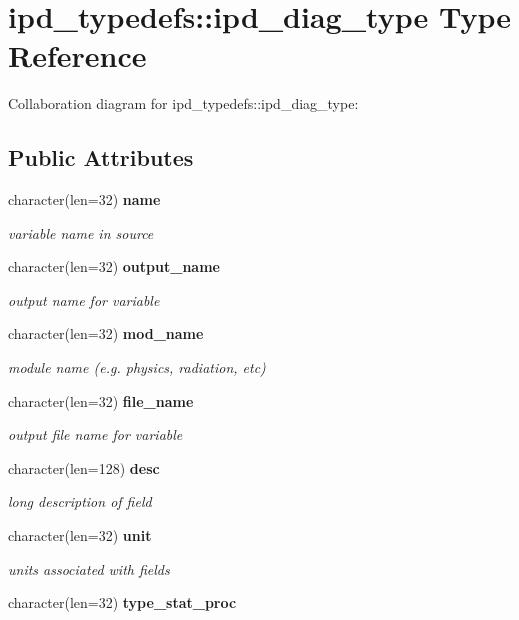 \section{ipd\+\_\+typedefs\+:\+:ipd\+\_\+diag\+\_\+type Type Reference}
\label{structipd__typedefs_1_1ipd__diag__type}


Collaboration diagram for ipd\+\_\+typedefs\+:\+:ipd\+\_\+diag\+\_\+type\+:
\subsection*{Public Attributes}
\begin{DoxyCompactItemize}
\item 
character(len=32) \textbf{ name}
\begin{DoxyCompactList}\small\item\em variable name in source \end{DoxyCompactList}\item 
character(len=32) \textbf{ output\+\_\+name}
\begin{DoxyCompactList}\small\item\em output name for variable \end{DoxyCompactList}\item 
character(len=32) \textbf{ mod\+\_\+name}
\begin{DoxyCompactList}\small\item\em module name (e.\+g. physics, radiation, etc) \end{DoxyCompactList}\item 
character(len=32) \textbf{ file\+\_\+name}
\begin{DoxyCompactList}\small\item\em output file name for variable \end{DoxyCompactList}\item 
character(len=128) \textbf{ desc}
\begin{DoxyCompactList}\small\item\em long description of field \end{DoxyCompactList}\item 
character(len=32) \textbf{ unit}
\begin{DoxyCompactList}\small\item\em units associated with fields \end{DoxyCompactList}\item 
character(len=32) \textbf{ type\+\_\+stat\+\_\+proc}

\end{DoxyCompactItemize}
